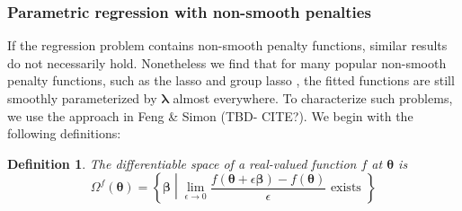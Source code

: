 \documentclass[12pt]{article}
\newtheorem{definition}{Definition}
\begin{document}
%	
%	
%	
%	
%	

\subsubsection{Parametric regression with non-smooth penalties}
\label{sec:param_nonsmooth}

If the regression problem contains non-smooth penalty functions, similar results do not necessarily hold. Nonetheless we find that for many popular non-smooth penalty functions, such as the lasso \citep{tibshirani1996regression} and group lasso \citep{yuan2006model}, the fitted functions are still smoothly parameterized by $\boldsymbol \lambda$ almost everywhere. To characterize such problems, we use the approach in Feng \& Simon (TBD- CITE?). We begin with the following definitions:

\begin{definition}
	The differentiable space of a real-valued function $f$ at $\boldsymbol{\theta}$ is
	\begin{equation}
	\Omega^{f}(\boldsymbol{\theta}) = \left \{ \boldsymbol{\beta} \middle | \lim_{\epsilon \rightarrow 0} \frac{f(\boldsymbol{\theta} + \epsilon \boldsymbol{\beta}) - f(\boldsymbol{\theta})}{\epsilon} \text{ exists } \right \}
	\end{equation}
\end{definition}
\end{document}
